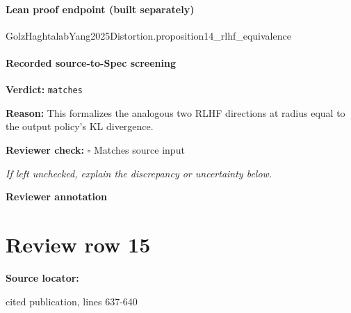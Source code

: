 \documentclass[10pt]{article}
\newcommand{\reviewerbox}{%
  \par\noindent\fbox{\parbox{0.96\linewidth}{\rule{0pt}{0.38in}}}\par
}
\newcommand{\reviewmatch}[1]{%
  \par\noindent\textbf{Reviewer check:} $\square$\; #1\par
  \noindent\emph{If left unchecked, explain the discrepancy or uncertainty below.}\par
}
\begin{document}
\paragraph{Lean proof endpoint (built separately)}\begin{ReviewVerbatim}
GolzHaghtalabYang2025Distortion.proposition14_rlhf_equivalence
\end{ReviewVerbatim}

\paragraph{Recorded source-to-Spec screening}
\textbf{Verdict:} \texttt{matches}
\\
{\raggedright
\textbf{Reason:} This formalizes the analogous two RLHF directions at radius equal to the output policy's KL divergence.\allowbreak{}
\par}
\reviewmatch{Matches source input}
\noindent\textbf{Reviewer annotation}\par
\reviewerbox
\clearpage
\hypertarget{source-claim-f1c80c98e2c74036}{}
\section*{Review row 15}
\textbf{Source locator:} {\footnotesize\raggedright cited publication, lines 637-\allowbreak{}640\par}
\end{document}
